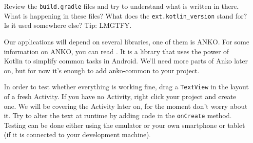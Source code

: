 \begin{exercise}
	Review the \texttt{build.gradle} files and try to understand what is written in there.
	What is happening in these files?
	What does the \texttt{ext.kotlin\_version} stand for?
	Is it used somewhere else? Tip: LMGTFY.
\end{exercise}

 \begin{exercise}
 	Our applications will depend on several libraries, one of them is ANKO.
	For some information on ANKO, you can read \cite{Bukros2017}.
	It is  a library that uses the power of Kotlin to simplify common tasks in Android.
	We’ll need more parts of Anko later on, but for now it’s enough to add anko-common to your project.
 \end{exercise}

\begin{exercise}
	In order to test whether everything is working fine, drag a \texttt{TextView} in the layout of a fresh Activity.
	If you have no Activity, right click your project and create one.
	We will be covering the Activity later on, for the moment don't worry about it.
	Try to alter the text at runtime by adding code in the \texttt{onCreate} method.
	Testing can be done either using the emulator or your own smartphone or tablet (if it is connected to your development machine).
\end{exercise}